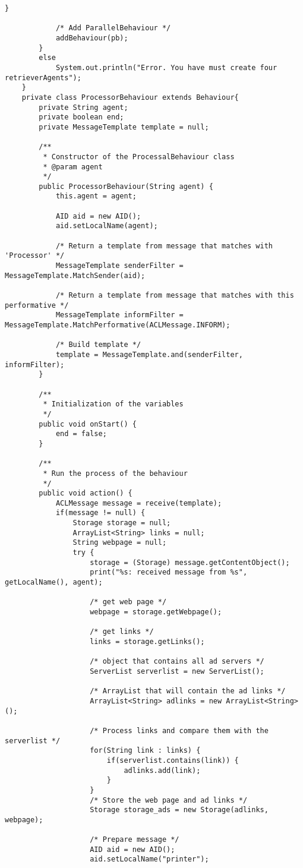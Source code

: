 \documentclass{pre-tfg}
\begin{document}
\begin{lstlisting}[caption=Código de extracción de anuncios de varios links de una URL,style=java]
			}
			
			/* Add ParallelBehaviour */
			addBehaviour(pb);
		}
		else
			System.out.println("Error. You have must create four retrieverAgents");
	}
	private class ProcessorBehaviour extends Behaviour{
		private String agent;
		private boolean end;
		private MessageTemplate template = null;

		/**
		 * Constructor of the ProcessalBehaviour class
		 * @param agent
		 */
		public ProcessorBehaviour(String agent) {
			this.agent = agent;

			AID aid = new AID();
			aid.setLocalName(agent);

			/* Return a template from message that matches with 'Processor' */
			MessageTemplate senderFilter = MessageTemplate.MatchSender(aid);

			/* Return a template from message that matches with this performative */
			MessageTemplate informFilter = MessageTemplate.MatchPerformative(ACLMessage.INFORM);

			/* Build template */
			template = MessageTemplate.and(senderFilter, informFilter);
		}

		/**
		 * Initialization of the variables
		 */
		public void onStart() {
			end = false;
		}

		/**
		 * Run the process of the behaviour
		 */
		public void action() {
			ACLMessage message = receive(template);
			if(message != null) {
				Storage storage = null;
				ArrayList<String> links = null;
				String webpage = null;
				try {
					storage = (Storage) message.getContentObject();
					print("%s: received message from %s", getLocalName(), agent);

					/* get web page */
					webpage = storage.getWebpage();

					/* get links */
					links = storage.getLinks();

					/* object that contains all ad servers */
					ServerList serverlist = new ServerList();

					/* ArrayList that will contain the ad links */
					ArrayList<String> adlinks = new ArrayList<String>();

					/* Process links and compare them with the serverlist */
					for(String link : links) {
						if(serverlist.contains(link)) {
							adlinks.add(link);
						}
					}					
					/* Store the web page and ad links */
					Storage storage_ads = new Storage(adlinks, webpage);

					/* Prepare message */
					AID aid = new AID();
					aid.setLocalName("printer");


\end{lstlisting}
\end{document}
